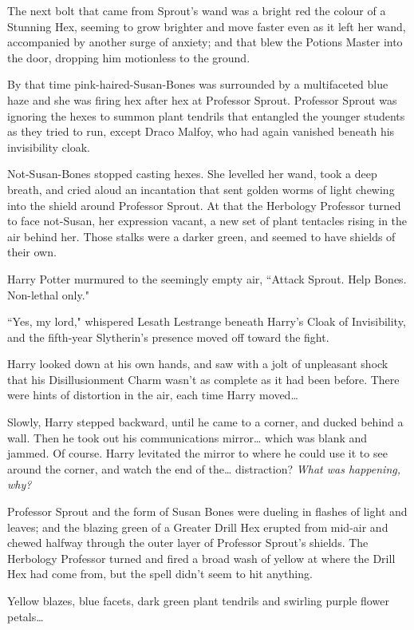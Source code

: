 The next bolt that came from Sprout's wand was a bright red the colour of a Stunning Hex, seeming to grow brighter and move faster even as it left her wand, accompanied by another surge of anxiety; and that blew the Potions Master into the door, dropping him motionless to the ground.

By that time pink-haired-Susan-Bones was surrounded by a multifaceted blue haze and she was firing hex after hex at Professor Sprout. Professor Sprout was ignoring the hexes to summon plant tendrils that entangled the younger students as they tried to run, except Draco Malfoy, who had again vanished beneath his invisibility cloak.

Not-Susan-Bones stopped casting hexes. She levelled her wand, took a deep breath, and cried aloud an incantation that sent golden worms of light chewing into the shield around Professor Sprout. At that the Herbology Professor turned to face not-Susan, her expression vacant, a new set of plant tentacles rising in the air behind her. Those stalks were a darker green, and seemed to have shields of their own.

Harry Potter murmured to the seemingly empty air, ``Attack Sprout. Help Bones. Non-lethal only."

``Yes, my lord," whispered Lesath Lestrange beneath Harry's Cloak of Invisibility, and the fifth-year Slytherin's presence moved off toward the fight.

Harry looked down at his own hands, and saw with a jolt of unpleasant shock that his Disillusionment Charm wasn't as complete as it had been before. There were hints of distortion in the air, each time Harry moved{\ldots}

Slowly, Harry stepped backward, until he came to a corner, and ducked behind a wall. Then he took out his communications mirror{\ldots} which was blank and jammed. Of course. Harry levitated the mirror to where he could use it to see around the corner, and watch the end of the{\ldots} distraction? \emph{What was happening, why?}

Professor Sprout and the form of Susan Bones were dueling in flashes of light and leaves; and the blazing green of a Greater Drill Hex erupted from mid-air and chewed halfway through the outer layer of Professor Sprout's shields. The Herbology Professor turned and fired a broad wash of yellow at where the Drill Hex had come from, but the spell didn't seem to hit anything.

Yellow blazes, blue facets, dark green plant tendrils and swirling purple flower petals{\ldots}

